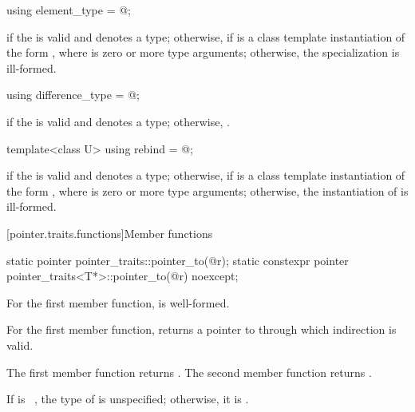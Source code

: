%
\begin{itemdecl}
using element_type = @\seebelow@;
\end{itemdecl}

\begin{itemdescr}
\pnum
\ctype {} if
the   is valid and denotes a
type; otherwise,  if
 is a class template instantiation of the form ,
where  is zero or more type arguments; otherwise, the specialization is
ill-formed.
\end{itemdescr}

%
\begin{itemdecl}
using difference_type = @\seebelow@;
\end{itemdecl}

\begin{itemdescr}
\pnum
\ctype {} if
the   is valid and denotes a
type; otherwise,
.
\end{itemdescr}

%
\begin{itemdecl}
template<class U> using rebind = @\seebelow@;
\end{itemdecl}

\begin{itemdescr}
\pnum
\templalias {} if
the   is valid and denotes a
type; otherwise,
 if
 is a class template instantiation of the form ,
where  is zero or more type arguments; otherwise, the instantiation of
 is ill-formed.
\end{itemdescr}

[pointer.traits.functions]{Member functions}

%
\begin{itemdecl}
static pointer pointer_traits::pointer_to(@\seebelow@ r);
static constexpr pointer pointer_traits<T*>::pointer_to(@\seebelow@ r) noexcept;
\end{itemdecl}

\begin{itemdescr}
\pnum
\mandates
For the first member function,
 is well-formed.

\pnum
\expects
For the first member function,
 returns a pointer to 
through which indirection is valid.

\pnum
\returns
The first member function returns .
The second member function returns .

\pnum
\remarks
If  is \cv{}~, the type of
 is unspecified; otherwise, it is .
\end{itemdescr}

